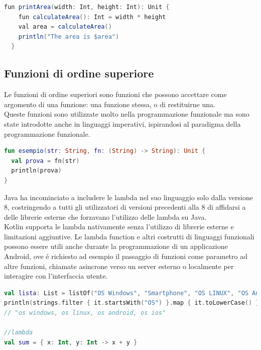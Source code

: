 \begin{lstlisting}[language=java,caption={Esempio Funzioni locali}]
  fun printArea(width: Int, height: Int): Unit {
    fun calculateArea(): Int = width * height
    val area = calculateArea()
    println("The area is $area")
  }
\end{lstlisting}

\subsection{Funzioni di ordine superiore }
Le funzioni di ordine superiori sono funzioni che possono accettare come argomento di una funzione: una funzione stessa, o di restituirne una.\\
Queste funzioni sono utilizzate molto nella programmazione funzionale ma sono state introdotte anche in linguaggi imperativi, ispirandosi al paradigma della programmazione funzionale. \\

\begin{lstlisting}[language=kotlin,caption={Funzioni ordine superiore}]
fun esempio(str: String, fn: (String) -> String): Unit {
  val prova = fn(str)
  println(prova)
}
\end{lstlisting}

Java ha incominciato a includere le lambda nel suo linguaggio solo dalla versione 8, costringendo a tutti gli utilizzatori di versioni precedenti alla 8 di affidarsi a delle librerie esterne che forzavano l'utilizzo delle lambda su Java. \\
Kotlin  supporta le lambda nativamente senza l'utilizzo di librerie esterne e limitazioni aggiuntive.
Le lambda function e altri costrutti di linguaggi funzionali possono essere utili anche durante la programmazione di un applicazione Android, ove \'e richiesto ad esempio il passaggio di funzioni come parametro ad altre funzioni, chiamate asincrone verso un server esterno o localmente per interagire con l'interfaccia utente.

\begin{lstlisting}[language=kotlin,caption={Esempio Kotlin Programmazione funzionale}]
val lista: List = listOf("OS Windows", "Smartphone", "OS LINUX", "OS Android", "RAM", "OS IOS", "Scarpe")
println(strings.filter { it.startsWith("OS") }.map { it.toLowerCase() }.joinToString())
// "os windows, os linux, os android, os ios"

//lambda
val sum = { x: Int, y: Int -> x + y }
\end{lstlisting}



